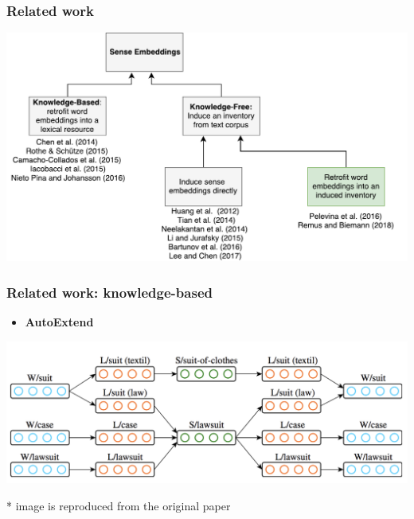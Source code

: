 \documentclass[usenames,dvipsnames]{beamer}
\begin{document}
\begin{frame}[fragile]
\frametitle{Related work}
\begin{center}
 \includegraphics[height=0.56\textwidth]{sense_embeddings}
 \end{center}
\end{frame}


\begin{frame}
\frametitle{Related work: knowledge-based}
\begin{itemize}
	\item \textbf{AutoExtend}~\cite{rothe-schutze:2015:ACL-IJCNLP}
\end{itemize}
\begin{center}
 \includegraphics[width=1.0\textwidth]{autoextend}
 \end{center}

{\footnotesize
 * image is reproduced from the original paper
}

\end{frame}
\end{document}
